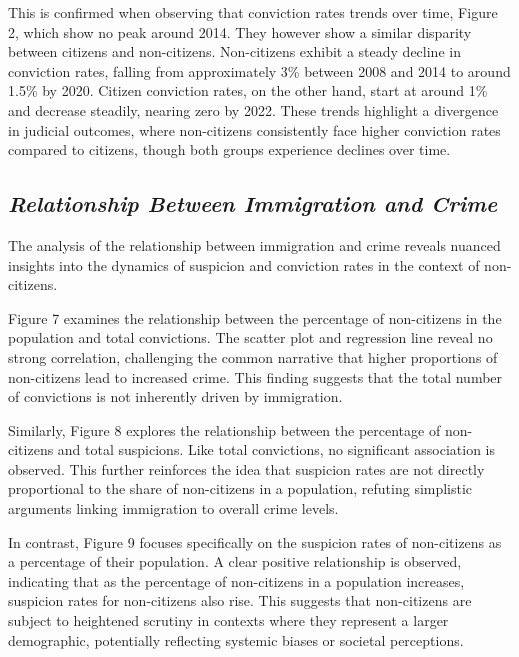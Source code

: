 \documentclass[
]{article}
\begin{document}
This is confirmed when observing that conviction rates trends over time,
Figure 2, which show no peak around 2014. They however show a similar
disparity between citizens and non-citizens. Non-citizens exhibit a
steady decline in conviction rates, falling from approximately 3\%
between 2008 and 2014 to around 1.5\% by 2020. Citizen conviction rates,
on the other hand, start at around 1\% and decrease steadily, nearing
zero by 2022. These trends highlight a divergence in judicial outcomes,
where non-citizens consistently face higher conviction rates compared to
citizens, though both groups experience declines over time.

\subsection{\texorpdfstring{\emph{Relationship Between Immigration and
Crime}}{Relationship Between Immigration and Crime}}\label{relationship-between-immigration-and-crime}

The analysis of the relationship between immigration and crime reveals
nuanced insights into the dynamics of suspicion and conviction rates in
the context of non-citizens.

Figure 7 examines the relationship between the percentage of
non-citizens in the population and total convictions. The scatter plot
and regression line reveal no strong correlation, challenging the common
narrative that higher proportions of non-citizens lead to increased
crime. This finding suggests that the total number of convictions is not
inherently driven by immigration.

Similarly, Figure 8 explores the relationship between the percentage of
non-citizens and total suspicions. Like total convictions, no
significant association is observed. This further reinforces the idea
that suspicion rates are not directly proportional to the share of
non-citizens in a population, refuting simplistic arguments linking
immigration to overall crime levels.

In contrast, Figure 9 focuses specifically on the suspicion rates of
non-citizens as a percentage of their population. A clear positive
relationship is observed, indicating that as the percentage of
non-citizens in a population increases, suspicion rates for non-citizens
also rise. This suggests that non-citizens are subject to heightened
scrutiny in contexts where they represent a larger demographic,
potentially reflecting systemic biases or societal perceptions.
\end{document}
